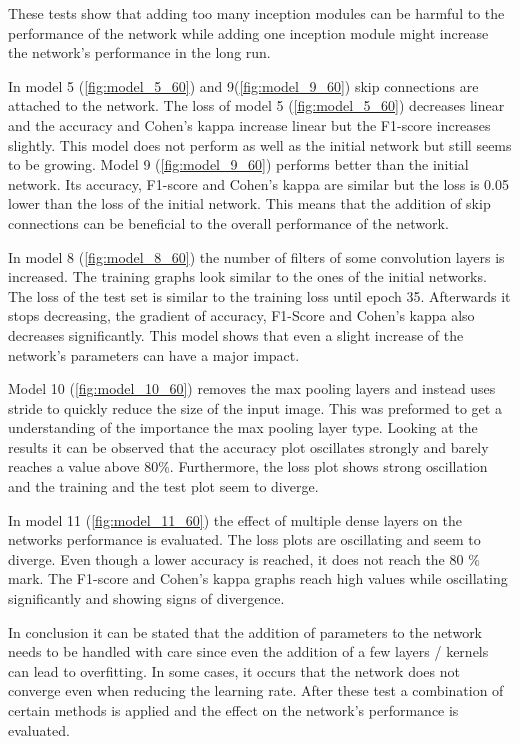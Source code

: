 \documentclass[
a4paper, 
12pt,
grayscalebody, %
abstract=on,
twoside, BCOR10mm, 12pt, DIV13,headinclude, footexclude, final, abstracton, openright
]{ibireprt}
\numberwithin{equation}{chapter}
\numberwithin{table}{chapter}
\numberwithin{figure}{chapter}
\numberwithin{algorithm}{chapter}
\numberwithin{example}{chapter}
\numberwithin{example}{chapter}
\begin{document}
These tests show that adding too many inception modules can be harmful to the performance of the network while adding one inception module might increase the network's performance in the long run. 

In model 5 (\ref{fig:model_5_60}) and 9(\ref{fig:model_9_60}) skip connections are attached to the network. The loss of model 5 (\ref{fig:model_5_60}) decreases linear and the accuracy and Cohen's kappa increase linear but the F1-score increases slightly. This model does not perform as well as the initial network but still seems to be growing. Model 9 (\ref{fig:model_9_60}) performs better than the initial network. Its accuracy, F1-score and Cohen's kappa are similar but the loss is 0.05 lower than the loss of the initial network. 
This means that the addition of skip connections can be beneficial to the overall performance of the network.

In model 8 (\ref{fig:model_8_60}) the number of filters of some convolution layers is increased. The training graphs look similar to the ones of the initial networks. The loss of the test set is similar to the training loss until epoch 35. Afterwards it stops decreasing, the gradient of accuracy, F1-Score and Cohen's kappa also decreases significantly. This model shows that even a slight increase of the network's parameters can have a major impact.

Model 10 (\ref{fig:model_10_60}) removes the max pooling layers and instead uses stride to quickly reduce the size of the input image. This was preformed to get a understanding of the importance the max pooling layer type. Looking at the results it can be observed that the accuracy plot oscillates strongly and barely reaches a value above 80\%. Furthermore, the loss plot shows strong oscillation and the training and the test plot seem to diverge.

In model 11 (\ref{fig:model_11_60}) the effect of multiple dense layers on the networks performance is evaluated. The loss plots are oscillating and seem to diverge. Even though a lower accuracy is reached, it does not reach the 80 \% mark. The F1-score and Cohen's kappa graphs reach high values while oscillating significantly and showing signs of divergence.

In conclusion it can be stated that the addition of parameters to the network needs to be handled with care since even the addition of a few layers / kernels can lead to overfitting. In some cases, it occurs that the network does not converge even when reducing the learning rate.
After these test a combination of certain methods is applied and the effect on the network's performance is evaluated. 
\end{document}
